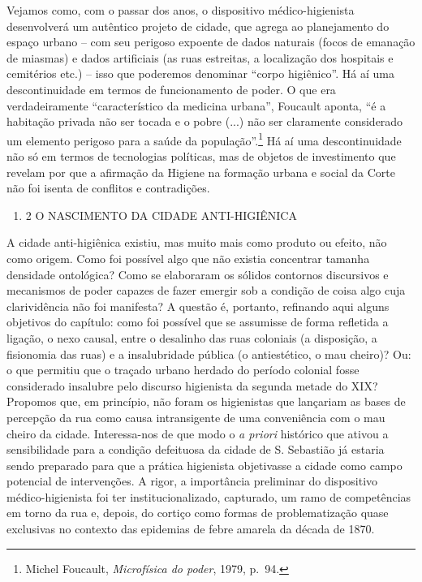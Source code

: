 Vejamos como, com o passar dos anos, o dispositivo médico-higienista
desenvolverá um autêntico projeto de cidade, que agrega ao planejamento
do espaço urbano -- com seu perigoso expoente de dados naturais (focos
de emanação de miasmas) e dados artificiais (as ruas estreitas, a
localização dos hospitais e cemitérios etc.) -- isso que poderemos
denominar ``corpo higiênico''. Há aí uma descontinuidade em termos de
funcionamento de poder. O que era verdadeiramente ``característico da
medicina urbana'', Foucault aponta, ``é a habitação privada não ser
tocada e o pobre (...) não ser claramente considerado um elemento
perigoso para a saúde da população''.\footnote{Michel Foucault,
  \emph{Microfísica do poder}, 1979, p.~94.} Há aí uma descontinuidade
não só em termos de tecnologias políticas, mas de objetos de
investimento que revelam por que a afirmação da Higiene na formação
urbana e social da Corte não foi isenta de conflitos e contradições.

\begin{enumerate}
\def\labelenumi{\arabic{enumi}.}
\setcounter{enumi}{3}
\tightlist
\item
  2 O NASCIMENTO DA CIDADE ANTI-HIGIÊNICA
\end{enumerate}

A cidade anti-higiênica existiu, mas muito mais como produto ou efeito,
não como origem. Como foi possível algo que não existia concentrar
tamanha densidade ontológica? Como se elaboraram os sólidos contornos
discursivos e mecanismos de poder capazes de fazer emergir sob a
condição de coisa algo cuja clarividência não foi manifesta? A questão
é, portanto, refinando aqui alguns objetivos do capítulo: como foi
possível que se assumisse de forma refletida a ligação, o nexo causal,
entre o desalinho das ruas coloniais (a disposição, a fisionomia das
ruas) e a insalubridade pública (o antiestético, o mau cheiro)? Ou: o
que permitiu que o traçado urbano herdado do período colonial fosse
considerado insalubre pelo discurso higienista da segunda metade do XIX?
Propomos que, em princípio, não foram os higienistas que lançariam as
bases de percepção da rua como causa intransigente de uma conveniência
com o mau cheiro da cidade. Interessa-nos de que modo o \emph{a priori}
histórico que ativou a sensibilidade para a condição defeituosa da
cidade de S. Sebastião já estaria sendo preparado para que a prática
higienista objetivasse a cidade como campo potencial de intervenções. A
rigor, a importância preliminar do dispositivo médico-higienista foi ter
institucionalizado, capturado, um ramo de competências em torno da rua
e, depois, do cortiço como formas de problematização quase exclusivas no
contexto das epidemias de febre amarela da década de 1870.

